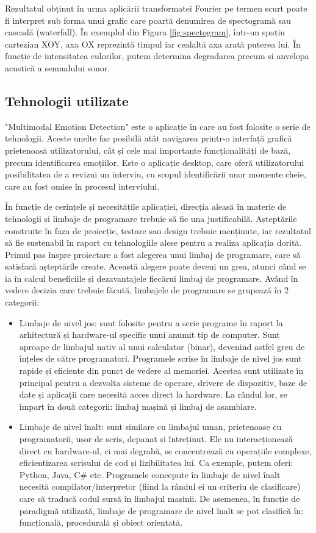 \documentclass[a4paper, 12pt]{report}
\begin{document}
	Rezultatul obținut în urma aplicării transformatei Fourier pe termen scurt poate fi interpret sub forma unui grafic care poartă denumirea de spectogramă sau cascadă (waterfall). În exemplul din Figura \ref{fig:spectogram}, într-un spațiu cartezian XOY, axa OX reprezintă timpul iar cealaltă axa arată puterea lui. În funcție de intensitatea culorilor, putem determina degradarea precum și anvelopa acustică a semnalului sonor.
	
	\clearpage
	\subsection{Tehnologii utilizate}
	"Multimodal Emotion Detection" este o aplicație în care au fost folosite o serie de tehnologii. Aceste unelte fac posibilă atât navigarea printr-o interfață grafică prietenoasă utilizatorului, cât și cele mai importante funcționalități de bază, precum identificarea emoțiilor. Este o aplicație desktop, care oferă utilizatorului posibilitatea de a revizui un interviu, cu scopul identificării unor momente cheie, care au fost omise în procesul interviului.
	
	În funcție de cerințele și necesitățile aplicației, direcția aleasă în materie de tehnologii și limbaje de programare trebuie să fie una justificabilă. Așteptările construite în faza de proiecție, testare sau design trebuie menținute, iar rezultatul să fie sustenabil în raport cu tehnologiile alese pentru a realiza aplicația dorită. Primul pas înspre proiectare a fost alegerea unui limbaj de programare, care să satisfacă așteptările create. Această alegere poate deveni un grea, atunci când se ia în calcul beneficiile și dezavantajele fiecărui limbaj de programare. Având în vedere decizia care trebuie făcută, limbajele de programare se grupează în 2 categorii:
	\begin{itemize}
		\item Limbaje de nivel jos: sunt folosite pentru a scrie programe în raport la arhitectură și hardware-ul specific unui anumit tip de computer. Sunt aproape de limbajul nativ al unui calculator (binar), devenind astfel greu de înțeles de către programatori.
		Programele scrise în limbaje de nivel jos sunt rapide și eficiente din punct de vedere al memoriei. Acestea sunt utilizate în principal pentru a dezvolta sisteme de operare, drivere de dispozitiv, baze de date și aplicații care necesită acces direct la hardware. La rândul lor, se împart în două categorii: limbaj mașină și limbaj de asamblare.
		\item Limbaje de nivel înalt: sunt similare cu limbajul uman, prietenoase cu programatorii, ușor de scris, depanat și întreținut. Ele nu interacționează direct cu hardware-ul, ci mai degrabă, se concentrează cu operațiile complexe, eficientizarea scrisului de cod și lizibilitatea lui. Ca exemple, putem oferi: Python, Java, C\# etc. Programele concepute în limbaje de nivel înalt necesită compilator/interpretor (fiind la rândul ei un criteriu de clasificare) care să traducă codul sursă în limbajul mașinii. De asemenea, în funcție de paradigmă utilizată, limbaje de programare de nivel înalt se pot clasifică în: funcțională, procedurală și obiect orientată.
	\end{itemize}
	
\end{document}
